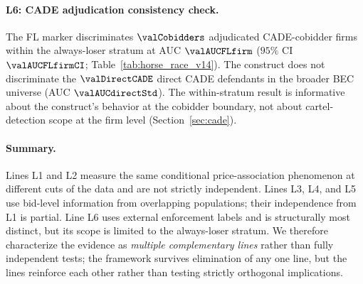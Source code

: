 \paragraph{L6: CADE adjudication consistency check.}
The FL marker discriminates $\valCobidders$ adjudicated
CADE-cobidder firms within the always-loser stratum at AUC
$\valAUCFLfirm$ ($95\%$ CI $\valAUCFLfirmCI$;
Table~\ref{tab:horse_race_v14}). The construct does not
discriminate the $\valDirectCADE$ direct CADE defendants in the
broader BEC universe (AUC $\valAUCdirectStd$). The within-stratum
result is informative about the construct's behavior at the
cobidder boundary, not about cartel-detection scope at the firm
level (Section~\ref{sec:cade}).

\paragraph{Summary.}
Lines L1 and L2 measure the same conditional price-association
phenomenon at different cuts of the data and are not strictly
independent. Lines L3, L4, and L5 use bid-level information from
overlapping populations; their independence from L1 is partial.
Line L6 uses external enforcement labels and is structurally most
distinct, but its scope is limited to the always-loser stratum.
We therefore characterize the evidence as
\emph{multiple complementary lines} rather than fully independent
tests; the framework survives elimination of any one line, but the
lines reinforce each other rather than testing strictly orthogonal
implications.
